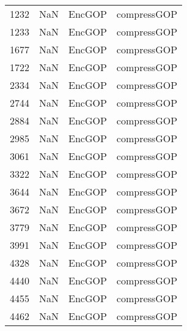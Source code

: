 \begin{tabular}{llll}
1232 &                   NaN &                     EncGOP &                               compressGOP \\
1233 &                   NaN &                     EncGOP &                               compressGOP \\
1677 &                   NaN &                     EncGOP &                               compressGOP \\
1722 &                   NaN &                     EncGOP &                               compressGOP \\
2334 &                   NaN &                     EncGOP &                               compressGOP \\
2744 &                   NaN &                     EncGOP &                               compressGOP \\
2884 &                   NaN &                     EncGOP &                               compressGOP \\
2985 &                   NaN &                     EncGOP &                               compressGOP \\
3061 &                   NaN &                     EncGOP &                               compressGOP \\
3322 &                   NaN &                     EncGOP &                               compressGOP \\
3644 &                   NaN &                     EncGOP &                               compressGOP \\
3672 &                   NaN &                     EncGOP &                               compressGOP \\
3779 &                   NaN &                     EncGOP &                               compressGOP \\
3991 &                   NaN &                     EncGOP &                               compressGOP \\
4328 &                   NaN &                     EncGOP &                               compressGOP \\
4440 &                   NaN &                     EncGOP &                               compressGOP \\
4455 &                   NaN &                     EncGOP &                               compressGOP \\
4462 &                   NaN &                     EncGOP &                               compressGOP \\

\end{tabular}
